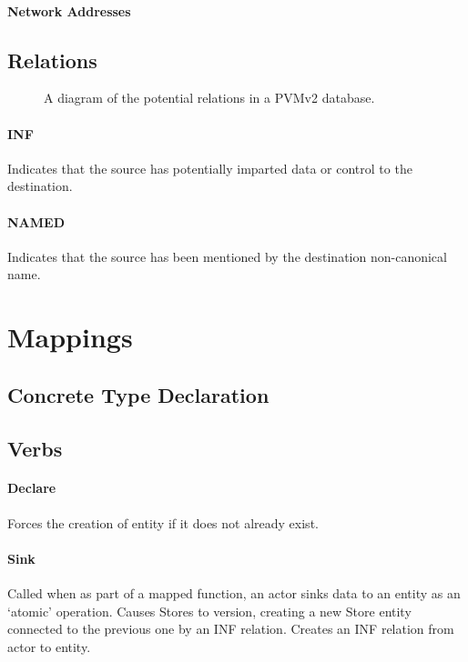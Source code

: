\documentclass[12pt,twoside,a4paper]{article}
\begin{document}
\paragraph{Network Addresses}

\subsection{Relations}

\begin{figure}[h]
\centering

\caption{A diagram of the potential relations in a PVMv2 database.}
\end{figure}

\paragraph{INF}
Indicates that the source has potentially imparted data or control to the destination.

\paragraph{NAMED}
Indicates that the source has been mentioned by the destination non-canonical name.

\section{Mappings}

\subsection{Concrete Type Declaration}

\subsection{Verbs}

\paragraph{Declare}
Forces the creation of entity if it does not already exist.

\paragraph{Sink}
Called when as part of a mapped function, an actor sinks data to an entity as an ‘atomic’ operation.
Causes Stores to version, creating a new Store entity connected to the previous one by an INF relation.
Creates an INF relation from actor to entity. 
\end{document}
